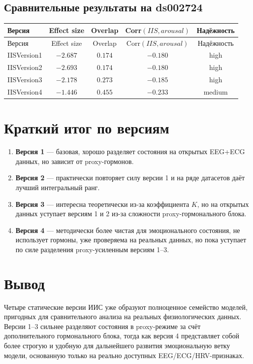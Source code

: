 \documentclass[12pt,a4paper]{article}
\begin{document}
\subsection{Сравнительные результаты на ds002724}
\begin{longtable}{>{\raggedright\arraybackslash}p{2.6cm}cccc}
\toprule
Версия & Effect size & Overlap & Corr$(IIS, arousal)$ & Надёжность \\
\midrule
\endfirsthead
\toprule
Версия & Effect size & Overlap & Corr$(IIS, arousal)$ & Надёжность \\
\midrule
\endhead
IISVersion1 & $-2.687$ & $0.174$ & $-0.180$ & high \\
IISVersion2 & $-2.693$ & $0.174$ & $-0.180$ & high \\
IISVersion3 & $-2.178$ & $0.273$ & $-0.185$ & high \\
IISVersion4 & $-1.446$ & $0.455$ & $-0.233$ & medium \\
\bottomrule
\end{longtable}

\section{Краткий итог по версиям}
\begin{enumerate}[leftmargin=1.25cm]
    \item \textbf{Версия 1} --- базовая, хорошо разделяет состояния на открытых EEG+ECG данных, но зависит от proxy-гормонов.
    \item \textbf{Версия 2} --- практически повторяет силу версии 1 и на ряде датасетов даёт лучший интегральный ранг.
    \item \textbf{Версия 3} --- интересна теоретически из-за коэффициента $K$, но на открытых данных уступает версиям 1 и 2 из-за сложности proxy-гормонального блока.
    \item \textbf{Версия 4} --- методически более чистая для эмоционального состояния, не использует гормоны, уже проверяема на реальных данных, но пока уступает по силе разделения proxy-усиленным версиям 1--3.
\end{enumerate}

\section{Вывод}
Четыре статические версии ИИС уже образуют полноценное семейство моделей, пригодных для сравнительного анализа на реальных физиологических данных. Версии 1--3 сильнее разделяют состояния в proxy-режиме за счёт дополнительного гормонального блока, тогда как версия 4 представляет собой более строгую и удобную для дальнейшего развития эмоциональную ветку модели, основанную только на реально доступных EEG/ECG/HRV-признаках.
\end{document}
